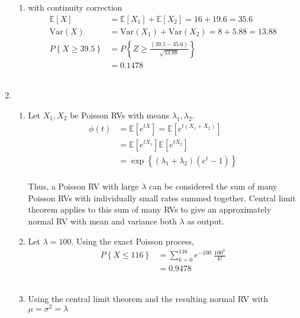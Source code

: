 \begin{enumerate}
\begin{enumerate}
			\item with continuity correction\\
			\begin{align}
				\mathbb{E}[X] &= \mathbb{E}[X_1] + \mathbb{E}[X_2] = 16 + 19.6 = 35.6 \nonumber \\
				\mathrm{Var}(X) &= \mathrm{Var}(X_1) + \mathrm{Var}(X_2) = 8 + 5.88 = 13.88 \nonumber \\
				P \left\{X \geq 39.5 \right\} &= P \left\{ Z \geq \frac{(39.5 - 35.6)}{\sqrt{13.88}} \right\} \nonumber \\
				&= 0.1478
			\end{align}\\
		\end{enumerate}
	
	
	\item
	
		\begin{enumerate}
			\item Let $ X_1, X_2 $ be Poisson RVs with  means $ \lambda_1, \lambda_2 $.\\
			
			\begin{align}
				\phi (t) &= \mathbb{E}[e^{tX}] = \mathbb{E}[e^{t(X_1 + X_2)}] \nonumber \\[1ex]
				&= \mathbb{E}[e^{tX_1}] \mathbb{E}[e^{tX_2}] \nonumber \\[1ex]
				&= \exp\left\{(\lambda_1 + \lambda_2) (e^t - 1)\right\}
			\end{align} \\
			
			Thus, a Poisson RV with large $\lambda$ can be considered the sum of many Poisson RVs with individually small rates summed together. Central limit theorem applies to this sum of many RVs to give an approximately normal RV with mean and variance both $ \lambda $ as output.\\
			
			\item Let $ \lambda = 100 $. Using the exact Poisson process,\\
			
			\begin{align}
				P \left\{X \leq 116 \right\} &= \sum\limits_{k=0}^{116} e^{-100}\ \frac{100^k}{k!} \nonumber \\
				&= 0.9478
			\end{align} \\
			
			\item Using the central limit theorem and the resulting normal RV with $ \mu = \sigma^2 = \lambda $
			

\end{enumerate}
\end{enumerate}
